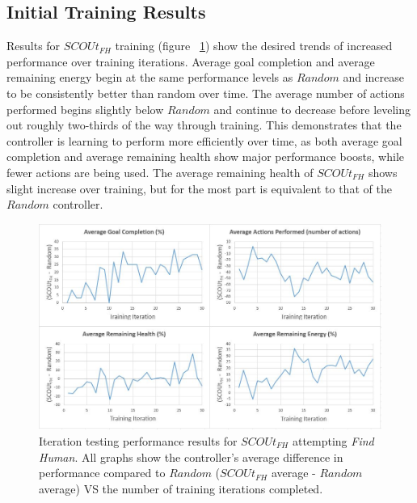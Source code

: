 \subsection{Initial Training Results}
Results for $SCOUt_{FH}$ training (figure ~\ref{fig:findhuman_training_results}) show the desired trends of increased performance over training iterations.
Average goal completion and average remaining energy begin at the same performance levels as $Random$ and increase to be consistently better than random over time.
The average number of actions performed begins slightly below $Random$ and continue to decrease before leveling out roughly two-thirds of the way through training.
This demonstrates that the controller is learning to perform more efficiently over time, as both average goal completion and average remaining health show major performance boosts, while fewer actions are being used.
The average remaining health of $SCOUt_{FH}$ shows slight increase over training, but for the most part is equivalent to that of the $Random$ controller.

\begin{figure}[H]
  \includegraphics[width=1.0\columnwidth]{Figures/Results/Training/SCOUt-FindHuman.JPG}
  \caption{Iteration testing performance results for $SCOUt_{FH}$ attempting \textit{Find Human}. All graphs show the controller's average difference in performance compared to $Random$ ($SCOUt_{FH}$ average - $Random$ average) VS the number of training iterations completed.}
  \label{fig:findhuman_training_results}
\end{figure}

